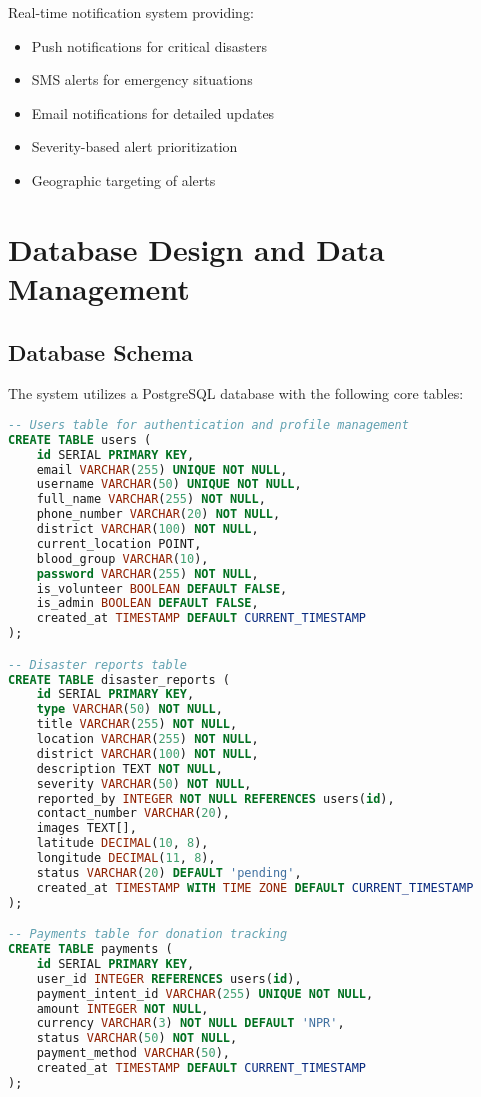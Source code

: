 \documentclass[12pt,a4paper]{article}
\begin{document}
Real-time notification system providing:
\begin{itemize}
    \item Push notifications for critical disasters
    \item SMS alerts for emergency situations
    \item Email notifications for detailed updates
    \item Severity-based alert prioritization
    \item Geographic targeting of alerts
\end{itemize}

\section{Database Design and Data Management}

\subsection{Database Schema}

The system utilizes a PostgreSQL database with the following core tables:

\begin{lstlisting}[language=SQL, caption=Core Database Tables]
-- Users table for authentication and profile management
CREATE TABLE users (
    id SERIAL PRIMARY KEY,
    email VARCHAR(255) UNIQUE NOT NULL,
    username VARCHAR(50) UNIQUE NOT NULL,
    full_name VARCHAR(255) NOT NULL,
    phone_number VARCHAR(20) NOT NULL,
    district VARCHAR(100) NOT NULL,
    current_location POINT,
    blood_group VARCHAR(10),
    password VARCHAR(255) NOT NULL,
    is_volunteer BOOLEAN DEFAULT FALSE,
    is_admin BOOLEAN DEFAULT FALSE,
    created_at TIMESTAMP DEFAULT CURRENT_TIMESTAMP
);

-- Disaster reports table
CREATE TABLE disaster_reports (
    id SERIAL PRIMARY KEY,
    type VARCHAR(50) NOT NULL,
    title VARCHAR(255) NOT NULL,
    location VARCHAR(255) NOT NULL,
    district VARCHAR(100) NOT NULL,
    description TEXT NOT NULL,
    severity VARCHAR(50) NOT NULL,
    reported_by INTEGER NOT NULL REFERENCES users(id),
    contact_number VARCHAR(20),
    images TEXT[],
    latitude DECIMAL(10, 8),
    longitude DECIMAL(11, 8),
    status VARCHAR(20) DEFAULT 'pending',
    created_at TIMESTAMP WITH TIME ZONE DEFAULT CURRENT_TIMESTAMP
);

-- Payments table for donation tracking
CREATE TABLE payments (
    id SERIAL PRIMARY KEY,
    user_id INTEGER REFERENCES users(id),
    payment_intent_id VARCHAR(255) UNIQUE NOT NULL,
    amount INTEGER NOT NULL,
    currency VARCHAR(3) NOT NULL DEFAULT 'NPR',
    status VARCHAR(50) NOT NULL,
    payment_method VARCHAR(50),
    created_at TIMESTAMP DEFAULT CURRENT_TIMESTAMP
);
\end{lstlisting}
\end{document}
